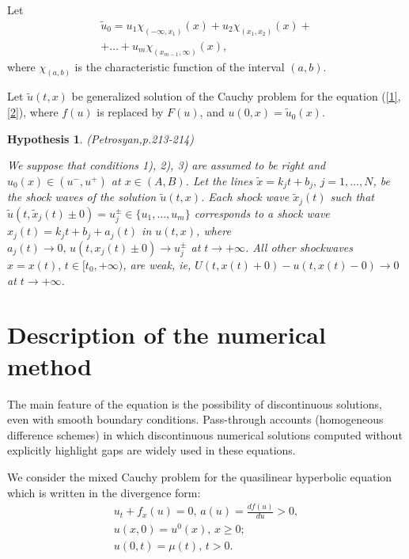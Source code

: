 \documentclass[journal]{IEEEtran}
\begin{document}
Let \begin{gather*}
\widetilde{u}_0 = u_1\chi_{(-\infty,x_1)}(x)+u_2\chi_{(x_1,x_2)}(x)+\\
+\ldots+u_m\chi_{(x_{m-1},\infty)}(x),
\end{gather*}
where  $\chi_{(a,b)}$  is the characteristic function of the interval $(a,b)$.

Let  $\widetilde{u} (t,x)$ be generalized solution of the Cauchy problem for the equation (\ref{1},\ref{2}), where $f(u)$ is replaced by $F(u)$, and $u(0,x) = \widetilde{u}_0(x)$.

\newtheorem{Hyp}{Hypothesis}
\begin{Hyp}\label{3} (Petrosyan\cite{petrosyan},p.213-214)
	
We suppose that conditions 1), 2), 3) are assumed to be right and $ u_0 (x) \in (u ^ {-}, u ^ {+}) $ at $ x \in (A, B) $. Let the lines $ \widetilde {x} = k_jt + b_j, \, j = 1, \ldots, N $, be the shock waves of the solution $ \widetilde {u} (t, x) $. Each shock wave $ \widetilde {x}_j (t) $ such that $ \widetilde {u} (t, \widetilde {x} _j (t) \pm 0) = u_j ^ {\pm} \in \{u_1, \ldots, u_m \} $ corresponds to a shock wave $ x_j (t) = k_jt + b_j + a_j (t) $ in $ u (t, x) $, where $ a_j (t) \rightarrow0, \, u (t, x_j (t) \pm0) \rightarrow u_j ^ {\pm} $ at $ t \rightarrow + \infty $. All other shockwaves $ x = x (t), \, t \in [t_0, + \infty) $, are weak, ie, $ U (t, x (t) +0) -u (t, x (t) -0) \rightarrow0 $ at $ t \rightarrow + \infty $.
\end{Hyp}

\section{Description of the numerical method}

The main feature of the equation is the possibility of discontinuous solutions, even with smooth boundary conditions. Pass-through accounts (homogeneous difference schemes) in which discontinuous numerical solutions computed without explicitly highlight gaps are widely used in these equations.

We consider the mixed Cauchy problem for the quasilinear hyperbolic equation which is written in the divergence form:
\begin{gather}\label{4}
u_t+f_x(u)=0,\, a(u) = \frac{df(u)}{du}>0,\\
u(x,0) = u^0(x),\, x\geq0;\\
u(0,t) = \mu(t),\, t>0.
\end{gather}
\end{document}
